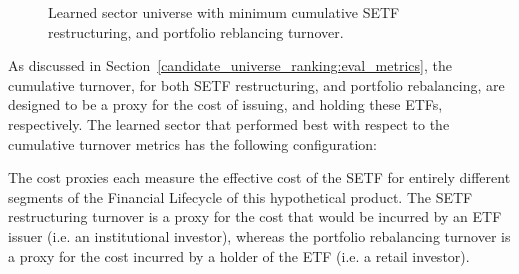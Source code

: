 \documentclass[../main.tex]{subfiles}
\begin{document}
\begin{figure}
    \centering
    \vspace{\wrapfigadjustment}
    \caption{Learned sector universe with minimum cumulative SETF restructuring, and portfolio reblancing turnover.}
    \label{fig:optimal_sector_universe:minimum_turnover}
\end{figure}

As discussed in Section~\ref{candidate_universe_ranking:eval_metrics}, the cumulative turnover, for both SETF restructuring, and portfolio rebalancing, are designed to be a proxy for the cost of issuing, and holding these ETFs, respectively. The learned sector that performed best with respect to the cumulative turnover metrics has the following configuration:

\vspace{0.5em}

\begin{minipage}{\linewidth}
    \centering
    \bfseries
\end{minipage}

\vspace{0.5em}

The cost proxies each measure the effective cost of the SETF for entirely different segments of the Financial Lifecycle of this hypothetical product. The SETF restructuring turnover is a proxy for the cost that would be incurred by an ETF issuer (i.e. an institutional investor), whereas the portfolio rebalancing turnover is a proxy for the cost incurred by a holder of the ETF (i.e. a retail investor).
\end{document}
